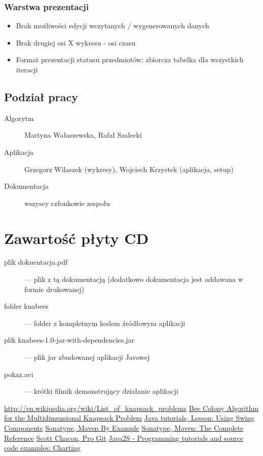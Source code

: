 \documentclass[a4paper,12pt,notitlepage]{mwrep}
\begin{document}
\subsection{Warstwa prezentacji}
\begin{itemize}
	\item	Brak możliwości edycji wczytanych / wygenerowanych danych
	\item	Brak drugiej osi X wykresu - osi czasu
	\item	Format prezentacji statusu przedmiotów: zbiorcza tabelka dla wszystkich iteracji
\end{itemize}

\section{Podział pracy}
\begin{description}
	\item[Algorytm] Martyna Wałaszewska, Rafał Szalecki
	\item[Aplikacja] Grzegorz Wilaszek (wykresy), Wojciech Krzystek (aplikacja, setup)
	\item[Dokumentacja] wszyscy członkowie zespołu
\end{description}


\addtocounter{page}{-1}

\appendix
\chapter*{Zawartość płyty CD}
\begin{description}
	\item[plik dokuentacja.pdf]	 --- plik z tą dokumentacją (dodatkowo dokumentacja jest oddawana w formie drukowanej)
	\item[folder knabees]	 --- folder z kompletnym kodem źródłowym aplikacji
	\item[plik knabees-1.0-jar-with-dependencies.jar]	 --- plik jar zbudowanej aplikacji Javowej
	\item[pokaz.avi]	 --- krótki filmik demonstrujący działanie aplikacji
\end{description}

\begin{thebibliography}{9}

	\href{http://en.wikipedia.org/wiki/List_of_knapsack_problems}{http://en.wikipedia.org/wiki/List\_of\_knapsack\_problems}
	\href{http://www.iaeng.org/publication/IMECS2008/IMECS2008_pp84-88.pdf}{Bee Colony Algorithm for the Multidimensional Knapsack Problem}
	\href{http://docs.oracle.com/javase/tutorial/uiswing/components/index.html}{Java tutorials, Lesson: Using Swing Components}
	\href{http://www.sonatype.com/Support/Books/Maven-By-Example}{Sonatype, Maven By Example}
	\href{http://www.sonatype.com/Support/Books/Maven-The-Complete-Reference}{Sonatype, Maven: The Complete Reference}
	\href{http://git-scm.com/book/}{Scott Chacon, Pro Git}
	\href{http://www.java2s.com/Code/Java/Chart/CatalogChart.htm}{Java2S - Programming tutorials and source code examples: Charting}

\end{thebibliography}


\label{LastPage}
\end{document}
